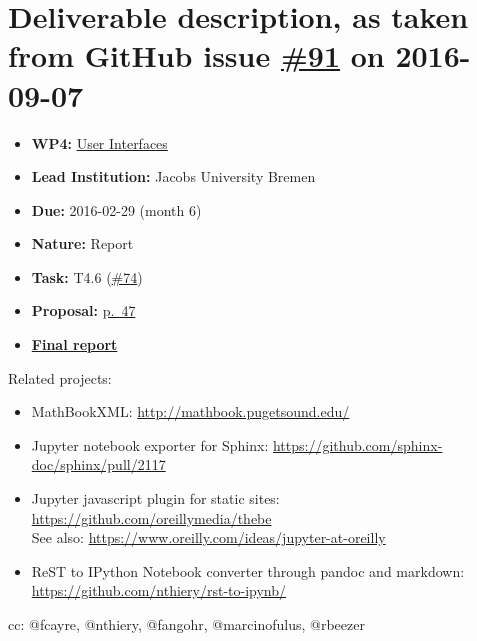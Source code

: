 \section*{\texorpdfstring{Deliverable description, as taken from GitHub
issue
\href{https://github.com/OpenDreamKit/OpenDreamKit/issues/91}{\#91} on
2016-09-07}{Deliverable description, as taken from GitHub issue \#91 on 2016-09-07}}\label{deliverable-description-as-taken-from-github-issues-91-on-2016-09-07}

\begin{itemize}
\tightlist
\item
  \textbf{WP4:}
  \href{https://github.com/OpenDreamKit/OpenDreamKit/tree/master/WP4}{User
  Interfaces}
\item
  \textbf{Lead Institution:} Jacobs University Bremen
\item
  \textbf{Due:} 2016-02-29 (month 6)
\item
  \textbf{Nature:} Report
\item
  \textbf{Task:} T4.6
  (\href{https://github.com/OpenDreamKit/OpenDreamKit/issues/74}{\#74})
\item
  \textbf{Proposal:}
  \href{https://github.com/OpenDreamKit/OpenDreamKit/raw/master/Proposal/proposal-www.pdf}{p.~47}
\item
  \textbf{\href{https://github.com/OpenDreamKit/OpenDreamKit/raw/master/WP4/D4.2/report-final.pdf}{Final
  report}}
\end{itemize}

Related projects:

\begin{itemize}
\tightlist
\item
  MathBookXML: \url{http://mathbook.pugetsound.edu/}
\item
  Jupyter notebook exporter for Sphinx:
  \url{https://github.com/sphinx-doc/sphinx/pull/2117}
\item
  Jupyter javascript plugin for static sites:
  \url{https://github.com/oreillymedia/thebe}\\
  See also: \url{https://www.oreilly.com/ideas/jupyter-at-oreilly}
\item
  ReST to IPython Notebook converter through pandoc and markdown:
  \url{https://github.com/nthiery/rst-to-ipynb/}
\end{itemize}

cc: @fcayre, @nthiery, @fangohr, @marcinofulus, @rbeezer
